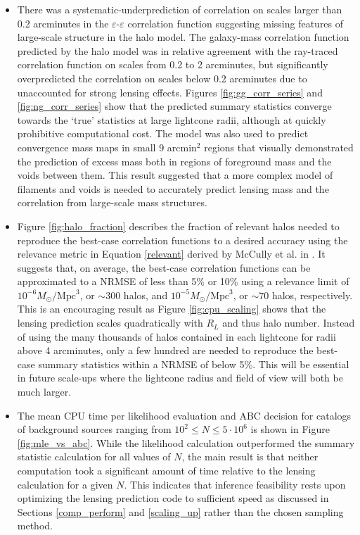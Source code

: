 \documentclass[%
 reprint,
 amsmath,amssymb,
 aps,nofootinbib
]{revtex4-1}
\begin{document}
\begin{itemize}
\item There was a systematic-underprediction of correlation on scales larger than 0.2 arcminutes in the $\varepsilon$-$\varepsilon$ correlation function suggesting missing features of large-scale structure in the halo model. The galaxy-mass correlation function predicted by the halo model was in relative agreement with the ray-traced correlation function on scales from 0.2 to 2 arcminutes, but significantly overpredicted the correlation on scales below 0.2 arcminutes due to unaccounted for strong lensing effects. Figures \ref{fig:gg_corr_series} and \ref{fig:ng_corr_series} show that the predicted summary statistics converge towards the `true' statistics at large lightcone radii, although at quickly prohibitive computational cost. The model was also used to predict convergence mass maps in small 9 arcmin$^2$ regions that visually demonstrated the prediction of excess mass both in regions of foreground mass and the voids between them. This result suggested that a more complex model of filaments and voids is needed to accurately predict lensing mass and the correlation from large-scale mass structures.

\item Figure \ref{fig:halo_fraction} describes the fraction of relevant halos needed to reproduce the best-case correlation functions to a desired accuracy using the relevance metric in Equation \eqref{relevant} derived by McCully et al. in \cite{mccully}. It suggests that, on average, the best-case correlation functions can be approximated to a NRMSE of less than 5\% or 10\% using a relevance limit of ${10^{-6}M_\odot/\text{Mpc}^3}$, or $\sim300$ halos, and ${10^{-5}M_\odot/\text{Mpc}^3}$, or $\sim70$ halos, respectively. This is an encouraging result as Figure \ref{fig:cpu_scaling} shows that the lensing prediction scales quadratically with $R_L$ and thus halo number. Instead of using the many thousands of halos contained in each lightcone for radii above 4 arcminutes, only a few hundred are needed to reproduce the best-case summary statistics within a NRMSE of below 5\%. This will be essential in future scale-ups where the lightcone radius and field of view will both be much larger.

\item The mean CPU time per likelihood evaluation and ABC decision for catalogs of background sources ranging from $10^2\leq N\leq5\cdot10^6$ is shown in Figure \ref{fig:mle_vs_abc}. While the likelihood calculation outperformed the summary statistic calculation for all values of $N$, the main result is that neither computation took a significant amount of time relative to the lensing calculation for a given $N$. This indicates that inference feasibility rests upon optimizing the lensing prediction code to sufficient speed as discussed in Sections \ref{comp_perform} and \ref{scaling_up} rather than the chosen sampling method.
\end{itemize}
\end{document}
